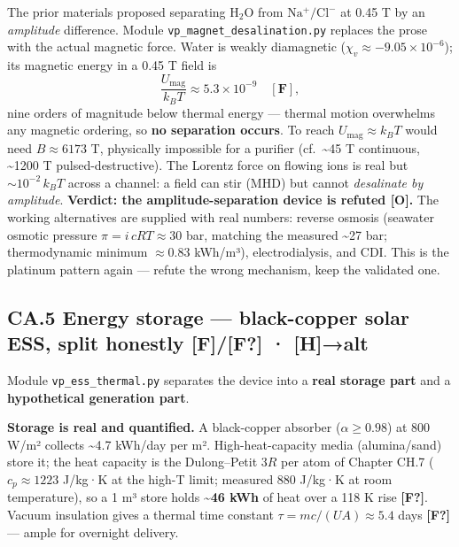 \documentclass[
  10pt,
]{article}
\begin{document}
The prior materials proposed separating \(\mathrm{H_2O}\) from
\(\mathrm{Na^+/Cl^-}\) at 0.45 T by an \emph{amplitude} difference.
Module \texttt{vp\_magnet\_desalination.py} replaces the prose with the
actual magnetic force. Water is weakly diamagnetic
(\(\chi_v\approx-9.05\times10^{-6}\)); its magnetic energy in a 0.45 T
field is
\[ \frac{U_{\text{mag}}}{k_BT} \approx 5.3\times10^{-9} \quad[\mathbf{F}], \]
nine orders of magnitude below thermal energy --- thermal motion
overwhelms any magnetic ordering, so \textbf{no separation occurs}. To
reach \(U_{\text{mag}}\approx k_BT\) would need \(B\approx 6173\) T,
physically impossible for a purifier (cf.~\textasciitilde45 T
continuous, \textasciitilde1200 T pulsed-destructive). The Lorentz force
on flowing ions is real but \(\sim10^{-2}\,k_BT\) across a channel: a
field can stir (MHD) but cannot \emph{desalinate by amplitude}.
\textbf{Verdict: the amplitude-separation device is refuted {[}O{]}.}
The working alternatives are supplied with real numbers: reverse osmosis
(seawater osmotic pressure \(\pi=i\,cRT\approx 30\) bar, matching the
measured \textasciitilde27 bar; thermodynamic minimum \(\approx0.83\)
kWh/m³), electrodialysis, and CDI. This is the platinum pattern again
--- refute the wrong mechanism, keep the validated one.

\hypertarget{ca.5-energy-storage-black-copper-solar-ess-split-honestly-ff-halt}{%
\subsection{\texorpdfstring{CA.5 Energy storage --- black-copper solar
ESS, split honestly \textbf{{[}F{]}/{[}F?{]} ·
{[}H{]}→alt}}{CA.5 Energy storage --- black-copper solar ESS, split honestly {[}F{]}/{[}F?{]} · {[}H{]}→alt}}\label{ca.5-energy-storage-black-copper-solar-ess-split-honestly-ff-halt}}

Module \texttt{vp\_ess\_thermal.py} separates the device into a
\textbf{real storage part} and a \textbf{hypothetical generation part}.

\textbf{Storage is real and quantified.} A black-copper absorber
(\(\alpha\ge0.98\)) at 800 W/m² collects \textasciitilde4.7 kWh/day per
m². High-heat-capacity media (alumina/sand) store it; the heat capacity
is the Dulong--Petit \(3R\) per atom of Chapter CH.7 (\(c_p\approx1223\)
J/kg·K at the high-T limit; measured 880 J/kg·K at room temperature), so
a 1 m³ store holds \textbf{\textasciitilde46 kWh} of heat over a 118 K
rise \textbf{{[}F?{]}}. Vacuum insulation gives a thermal time constant
\(\tau=mc/(UA)\approx 5.4\) days \textbf{{[}F?{]}} --- ample for
overnight delivery.
\end{document}
